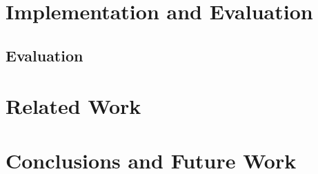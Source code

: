 \documentclass{llncs}
\begin{document}
\section{Implementation and Evaluation}
\label{sec:implementation}

\subsection{Evaluation}
\label{sec:results}
 
%

%

%

\section{Related Work}
\label{sec:related}

\section{Conclusions and Future Work}
\label{sec:conclusion}

\end{document}
